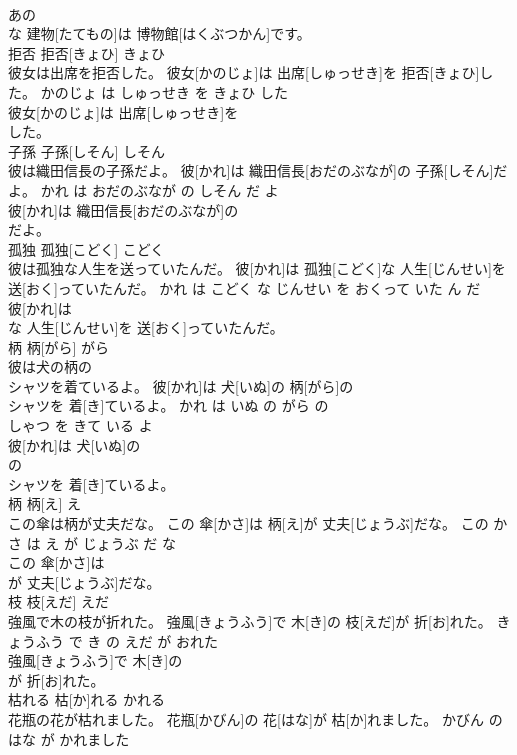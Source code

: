 \documentclass[8pt]{extreport}
\begin{document}
\begin{CJK}{UTF8}{min}
\\	あの
\\	な 建物[たてもの]は 博物館[はくぶつかん]です。			
\\	拒否	拒否[きょひ]	きょひ	
\\	彼女は出席を拒否した。	彼女[かのじょ]は 出席[しゅっせき]を 拒否[きょひ]した。	かのじょ は しゅっせき を きょひ した	
\\	彼女[かのじょ]は 出席[しゅっせき]を
\\	した。			
\\	子孫	子孫[しそん]	しそん	
\\	彼は織田信長の子孫だよ。	彼[かれ]は 織田信長[おだのぶなが]の 子孫[しそん]だよ。	かれ は おだのぶなが の しそん だ よ	
\\	彼[かれ]は 織田信長[おだのぶなが]の
\\	だよ。			
\\	孤独	孤独[こどく]	こどく	
\\	彼は孤独な人生を送っていたんだ。	彼[かれ]は 孤独[こどく]な 人生[じんせい]を 送[おく]っていたんだ。	かれ は こどく な じんせい を おくって いた ん だ	
\\	彼[かれ]は
\\	な 人生[じんせい]を 送[おく]っていたんだ。			
\\	柄	柄[がら]	がら	
\\	彼は犬の柄の
\\	シャツを着ているよ。	彼[かれ]は 犬[いぬ]の 柄[がら]の
\\	シャツを 着[き]ているよ。	かれ は いぬ の がら の 
\\	しゃつ を きて いる よ	
\\	彼[かれ]は 犬[いぬ]の
\\	の
\\	シャツを 着[き]ているよ。			
\\	柄	柄[え]	え	
\\	この傘は柄が丈夫だな。	この 傘[かさ]は 柄[え]が 丈夫[じょうぶ]だな。	この かさ は え が じょうぶ だ な	
\\	この 傘[かさ]は
\\	が 丈夫[じょうぶ]だな。			
\\	枝	枝[えだ]	えだ	
\\	強風で木の枝が折れた。	強風[きょうふう]で 木[き]の 枝[えだ]が 折[お]れた。	きょうふう で き の えだ が おれた	
\\	強風[きょうふう]で 木[き]の
\\	が 折[お]れた。			
\\	枯れる	枯[か]れる	かれる	
\\	花瓶の花が枯れました。	花瓶[かびん]の 花[はな]が 枯[か]れました。	かびん の はな が かれました	

\end{CJK}
\end{document}
